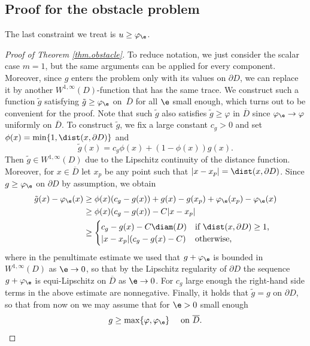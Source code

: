 \subsection{Proof for the obstacle problem}
The last constraint we treat is $u\geq \varphi_{\e}$.
\begin{proof}[Proof of Theorem \ref{thm.obstacle}]
To reduce notation, we just consider the scalar case $m=1$, but the same arguments can be applied for every component. Moreover, since $g$ enters the problem only with its values on $\partial D$, we can replace it by another $W^{1,\infty}(D)$-function that has the same trace. We construct such a function $\tilde{g}$ satisfying $\tilde{g}\geq\varphi_{\e}$ on~$\overline{D}$ for all $\e$ small enough, which turns out to be convenient for the proof. Note that such $\tilde{g}$ also satisfies $\tilde{g}\geq\varphi$ in $\overline{D}$ since $\varphi_{\e}\to\varphi$ uniformly on $\overline{D}$. To construct $\widetilde{g}$, we fix a large constant $c_g>0$ and set $\phi(x)=\min\{1,\dist(x,\partial D)\}$ and
\begin{equation*}
\tilde{g}(x)=c_g\phi(x)+(1-\phi(x))g(x).
\end{equation*}
Then $\tilde{g}\in W^{1,\infty}(D)$ due to the Lipschitz continuity of the distance function. Moreover, for $x\in\overline{D}$ let $x_{p}$ be any point such that $|x-x_{p}|=\dist(x,\partial D)$. Since $g\geq\varphi_{\e}$ on $\partial D$ by assumption, we obtain
\begin{align*}
\tilde{g}(x)-\varphi_{\e}(x)&\geq \phi(x)(c_g-g(x))+g(x)-g(x_{p})+\varphi_{\e}(x_{p})-\varphi_{\e}(x)
\\
&\geq \phi(x)(c_g-g(x))-C|x-x_{p}|
\\
&\geq\begin{cases}
c_g-g(x)-C\diam(D) &\mbox{if $\dist(x,\partial D)\geq 1$,}
\\
|x-x_{p}|(c_g-g(x)-C) &\mbox{otherwise,}
\end{cases}
\end{align*}
where in the penultimate estimate we used that $g+\varphi_{\e}$ is bounded in $W^{1,\infty}(D)$ as $\e\to 0$, so that by the Lipschitz regularity of $\partial D$ the sequence $g+\varphi_{\e}$ is equi-Lipschitz on $\overline{D}$ as $\e\to 0$. For $c_g$ large enough the right-hand side terms in the above estimate are nonnegative. Finally, it holds that $\tilde{g}=g$ on $\partial D$, so that from now on we may assume that for $\e>0$ small enough \begin{equation}\label{eq:boundaryconditionprepared}
g\geq \max\{\varphi,\varphi_{\e}\}\quad\text{ on }\overline{D}.

\end{equation}
\end{proof}
